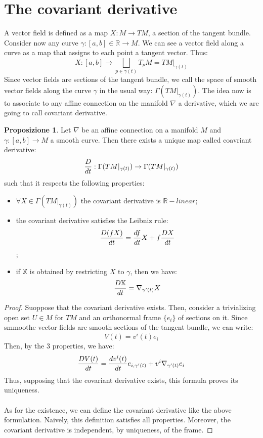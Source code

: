 \documentclass[12pt,a4paper]{report}
\theoremstyle{definition}
\theoremstyle{Theorem}
\newtheorem{Prop}[Def]{Proposizione}
\theoremstyle{definition}
\theoremstyle{definition}
\theoremstyle{definition}
\begin{document}
	\section{The covariant derivative}
	A vector field is defined as a map $X:M\rightarrow TM$, a section of the tangent bundle. Consider now any curve $\gamma:[a,b]\in\mathbb{R}\rightarrow M$. We can see a vector field along a curve as a map that assigns to each point a tangent vector. Thus:
	$$X:[a,b]\rightarrow \bigsqcup_{p\in \gamma(t)} T_pM=TM|_{\gamma(t)}$$
	Since vector fields are sections of the tangent bundle, we call the space of smooth vector fields along the curve $\gamma$ in the usual way: $\Gamma(TM|_{\gamma(t)})$.
	The idea now is to associate to any affine connection on the manifold $\nabla$ a derivative, which we are going to call covariant derivative.
	\begin{Prop}
		Let $\nabla$ be an affine connection on a manifold $M$ and $\gamma:[a,b]\rightarrow M$ a smooth curve. Then there exists a unique map called coavriant derivative:
		$${D\over dt}:\Gamma(TM|_{\gamma(t)})\rightarrow\Gamma(TM|_{\gamma(t)})$$
		such that it respects the following properties:
		\begin{itemize}
			\item $\forall X\in \Gamma(TM|_{\gamma(t)})$ the covariant derivative is $\mathbb{R}-linear$;
			\item the covariant derivative satisfies the Leibniz rule:
			$${D(fX)\over dt}={df\over dt}X+f{DX\over dt}$$;
			\item if $\mathbb{X}$ is obtained by restricting $X$ to $\gamma$, then we have:
			$${D\mathbb{X}\over dt}=\nabla_{\gamma'(t)}X$$
		\end{itemize}
	\end{Prop}
	\begin{proof}
		Suoppose that the covariant derivative exists. Then, consider a trivializing open set $U\in M$ for $TM$ and an orthonormal frame $\{e_i\}$ of sections on it. Since smmoothe vector fields are smooth sections of the tangent bundle, we can write:
		$$V(t)=v^i(t)e_i$$
		Then, by the 3 properties, we have:
		$${DV(t)\over dt}={dv^i(t)\over dt}e_{i,\gamma'(t)}+v^i\nabla_{\gamma'(t)}e_i$$
		Thus, supposing that the covariant derivative exists, this formula proves its uniqueness.\\
		\\
		As for the existence, we can define the covariant derivative like the above formulation. Naively, this definition satisfies all properties. Moreover, the covariant derivative is independent, by uniqueness, of the frame.
	\end{proof}
\end{document}
